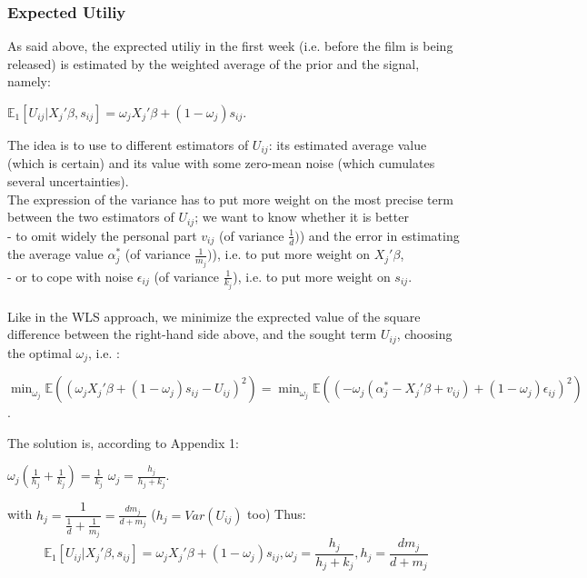 \subsubsection{Expected Utiliy}
As said above, the exprected utiliy in the first week (i.e. before the film is being released) is estimated by the weighted average of the prior and the signal, namely:
\begin{center}
	$\mathbb{E}_1[U_{i j}|X_{j}'\beta, s_{i j}]=\omega_{j} X_{j}'\beta+(1-\omega_{j})s_{i j}$.
\end{center}
The idea is to use to different estimators of $U_{i j}$: its estimated average value (which is certain) and its value with some zero-mean noise (which cumulates several uncertainties).\\
The expression of the variance has to put more weight on the most precise term between the two estimators of $U_{i j}$; we want to know whether it is better \\
- to omit widely the personal part $v_{i j}$ (of variance $\frac{1}{d})$) and the error in estimating the average value $\alpha_{j}^{*}$ (of variance $\frac{1}{m_{j}})$), i.e. to put more weight on $X_{j}'\beta$,\\
- or to cope with noise $\epsilon_{i j}$ (of variance $\frac{1}{k_{j}}$), i.e. to put more weight on $s_{i j}$.\\
\\
Like in the WLS approach, we minimize the exprected value of the square difference between the right-hand side above, and the sought term $U_{i j}$, choosing the optimal $\omega_{j}$, i.e. :
\begin{center}
	$\min_{\omega_{j}} \mathbb{E}((\omega_{j} X_{j}'\beta+(1-\omega_{j})s_{i j}-U_{i j})^{2})=\min_{\omega_{j}} \mathbb{E}((-\omega_{j} (\alpha_{j}^{*}-X_{j}'\beta+v_{i j})+(1-\omega_{j})\epsilon_{i j})^{2})$.
\end{center}
The solution is, according to Appendix 1:
\begin{center}
	$\omega_{j}(\frac{1}{h_{j}}+\frac{1}{k_{j}})=\frac{1}{k_{j}}$
	$\omega_j=\frac{h_{j}}{h_{j}+k_{j}}$.
\end{center}
with $h_{j}=\dfrac{1}{\frac{1}{d}+\frac{1}{m_{j}}}=\frac{d m_{j}}{d+m_{j}}$ ($h_{j}=Var(U_{i j})$ too)
Thus:
\begin{equation}
\mathbb{E}_1[U_{i j}|X_{j}'\beta, s_{i j}]=\omega_{j} X_{j}'\beta+(1-\omega_{j})s_{i j}, \omega_j=\frac{h_{j}}{h_{j}+k_{j}}, h_{j}=\frac{d m_{j}}{d+m_{j}}
\end{equation}
\\

